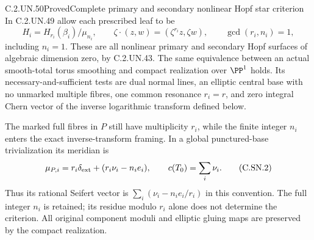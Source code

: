 \begin{statement}{C.2.UN.50}{Proved}{Complete primary and secondary nonlinear Hopf star criterion}
In C.2.UN.49 allow each prescribed leaf to be
\[
 H_i=H_{r_i}(\beta_i)/\mu_{n_i},\qquad
 \zeta\cdot(z,w)=(\zeta^{r_i}z,\zeta w),\qquad
                         \gcd(r_i,n_i)=1,               \tag{C.SN.1}
\]
including $n_i=1$. These are all nonlinear primary and
secondary Hopf surfaces of algebraic dimension zero,
by C.2.UN.43. The same equivalence between an actual
smooth-total torus smoothing and compact realization
over $\PP^1$ holds. Its necessary-and-sufficient tests
are dual normal lines, an elliptic central base with
no unmarked multiple fibres, one common resonance
$r_i=r$, and zero integral Chern vector of the
inverse logarithmic transform defined below.

The marked full fibres in $P$ still have multiplicity
$r_i$, while the finite integer $n_i$ enters the
exact inverse-transform framing. In a global
punctured-base trivialization its meridian is
\[
       \mu_{P,i}=r_i\delta_{\rm ext}
                         +(r_i\nu_i-n_i e_i),\qquad
                         c(T_0)=\sum_i\nu_i.             \tag{C.SN.2}
\]
Thus its rational Seifert vector is
$\sum_i(\nu_i-n_i e_i/r_i)$ in this convention.
The full integer $n_i$ is retained; its residue
modulo $r_i$ alone does not determine the criterion.
All original component moduli and elliptic gluing
maps are preserved by the compact realization.
\end{statement}


